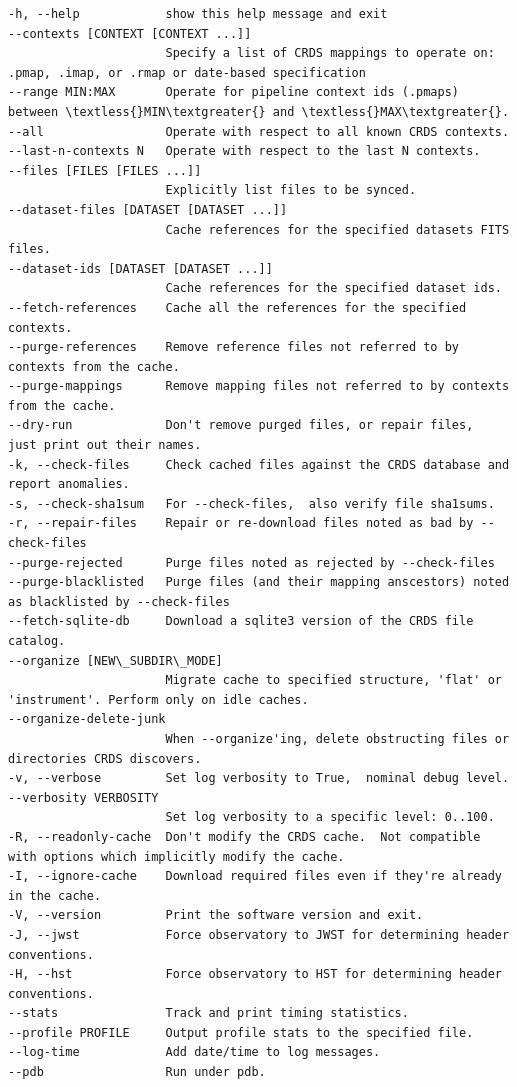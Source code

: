 \documentclass[letterpaper,10pt,english]{sphinxmanual}
\begin{document}
\begin{Verbatim}[commandchars=\\\{\}]
-h, --help            show this help message and exit
--contexts [CONTEXT [CONTEXT ...]]
                      Specify a list of CRDS mappings to operate on: .pmap, .imap, or .rmap or date-based specification
--range MIN:MAX       Operate for pipeline context ids (.pmaps) between \textless{}MIN\textgreater{} and \textless{}MAX\textgreater{}.
--all                 Operate with respect to all known CRDS contexts.
--last-n-contexts N   Operate with respect to the last N contexts.
--files [FILES [FILES ...]]
                      Explicitly list files to be synced.
--dataset-files [DATASET [DATASET ...]]
                      Cache references for the specified datasets FITS files.
--dataset-ids [DATASET [DATASET ...]]
                      Cache references for the specified dataset ids.
--fetch-references    Cache all the references for the specified contexts.
--purge-references    Remove reference files not referred to by contexts from the cache.
--purge-mappings      Remove mapping files not referred to by contexts from the cache.
--dry-run             Don't remove purged files, or repair files,  just print out their names.
-k, --check-files     Check cached files against the CRDS database and report anomalies.
-s, --check-sha1sum   For --check-files,  also verify file sha1sums.
-r, --repair-files    Repair or re-download files noted as bad by --check-files
--purge-rejected      Purge files noted as rejected by --check-files
--purge-blacklisted   Purge files (and their mapping anscestors) noted as blacklisted by --check-files
--fetch-sqlite-db     Download a sqlite3 version of the CRDS file catalog.
--organize [NEW\_SUBDIR\_MODE]
                      Migrate cache to specified structure, 'flat' or 'instrument'. Perform only on idle caches.
--organize-delete-junk
                      When --organize'ing, delete obstructing files or directories CRDS discovers.
-v, --verbose         Set log verbosity to True,  nominal debug level.
--verbosity VERBOSITY
                      Set log verbosity to a specific level: 0..100.
-R, --readonly-cache  Don't modify the CRDS cache.  Not compatible with options which implicitly modify the cache.
-I, --ignore-cache    Download required files even if they're already in the cache.
-V, --version         Print the software version and exit.
-J, --jwst            Force observatory to JWST for determining header conventions.
-H, --hst             Force observatory to HST for determining header conventions.
--stats               Track and print timing statistics.
--profile PROFILE     Output profile stats to the specified file.
--log-time            Add date/time to log messages.
--pdb                 Run under pdb.
\end{Verbatim}
\end{document}
